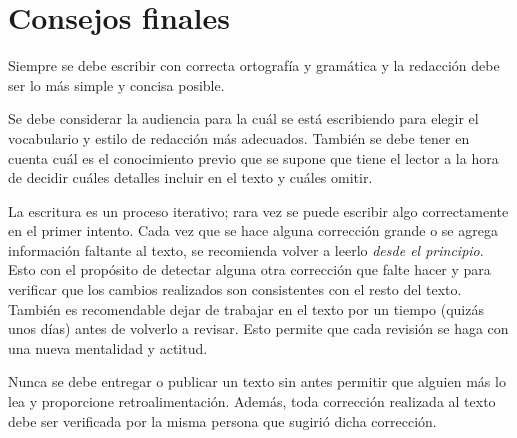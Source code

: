 

\section{Consejos finales}

Siempre se debe escribir con correcta ortografía y gramática y la redacción debe ser lo más simple y concisa posible.

Se debe considerar la audiencia para la cuál se está escribiendo para elegir el vocabulario y estilo de redacción más adecuados.
También se debe tener en cuenta cuál es el conocimiento previo que se supone que tiene el lector a la hora de decidir cuáles detalles incluir en el texto y cuáles omitir.

La escritura es un proceso iterativo; rara vez se puede escribir algo correctamente en el primer intento. 
Cada vez que se hace alguna corrección grande o se agrega información faltante al texto, se recomienda volver a leerlo \emph{desde el principio}.
Esto con el propósito de detectar alguna otra corrección que falte hacer y para verificar que los cambios realizados son consistentes con el resto del texto.
También es recomendable dejar de trabajar en el texto por un tiempo (quizás unos días) antes de volverlo a revisar.
Esto permite que cada revisión se haga con una nueva mentalidad y actitud.

Nunca se debe entregar o publicar un texto sin antes permitir que alguien más lo lea y proporcione retroalimentación.
Además, toda corrección realizada al texto debe ser verificada por la misma persona que sugirió dicha corrección. 

